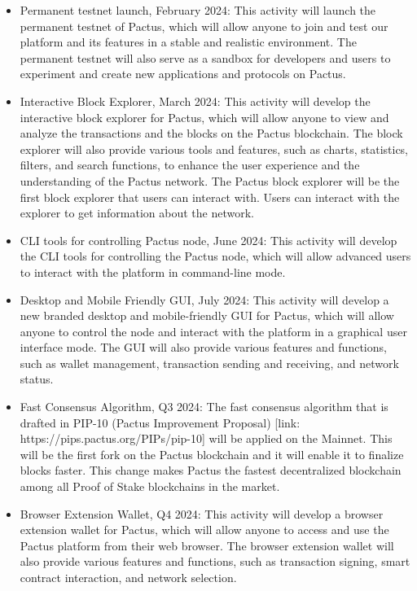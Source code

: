 \documentclass{novel}
\begin{document}
\begin{itemize}
  \item
        Permanent testnet launch, February 2024: This activity will launch the permanent testnet of Pactus, which will allow anyone to join and test our platform and its features in a stable and realistic environment. The permanent testnet will also serve as a sandbox for developers and users to experiment and create new applications and protocols on Pactus.
  \item
        Interactive Block Explorer, March 2024: This activity will develop the interactive block explorer for Pactus, which will allow anyone to view and analyze the transactions and the blocks on the Pactus blockchain. The block explorer will also provide various tools and features, such as charts, statistics, filters, and search functions, to enhance the user experience and the understanding of the Pactus network. The Pactus block explorer will be the first block explorer that users can interact with. Users can interact with the explorer to get information about the network.
  \item
        CLI tools for controlling Pactus node, June 2024: This activity will develop the CLI tools for controlling the Pactus node, which will allow advanced users to interact with the platform in command-line mode.
  \item
        Desktop and Mobile Friendly GUI, July 2024: This activity will develop a new branded desktop and mobile-friendly GUI for Pactus, which will allow anyone to control the node and interact with the platform in a graphical user interface mode. The GUI will also provide various features and functions, such as wallet management, transaction sending and receiving, and network status.
  \item
        Fast Consensus Algorithm, Q3 2024: The fast consensus algorithm that is drafted in PIP-10 (Pactus Improvement Proposal) [link: https://pips.pactus.org/PIPs/pip-10] will be applied on the Mainnet. This will be the first fork on the Pactus blockchain and it will enable it to finalize blocks faster. This change makes Pactus the fastest decentralized blockchain among all Proof of Stake blockchains in the market.
  \item
        Browser Extension Wallet, Q4 2024: This activity will develop a browser extension wallet for Pactus, which will allow anyone to access and use the Pactus platform from their web browser. The browser extension wallet will also provide various features and functions, such as transaction signing, smart contract interaction, and network selection.
\end{itemize}
\end{document}
